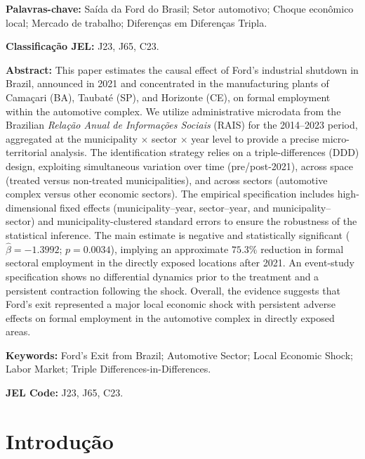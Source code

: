 \documentclass[12pt,a4paper]{article}
\begin{document}
\medskip
\noindent\textbf{Palavras-chave:} Sa\'ida da Ford do Brasil; Setor automotivo; Choque econ\^omico local; Mercado de trabalho; Diferen\c{c}as em Diferen\c{c}as Tripla.

\medskip
\noindent\textbf{Classifica\c{c}\~ao JEL:} J23, J65, C23.

\bigskip

\noindent\textbf{Abstract:} This paper estimates the causal effect of Ford's industrial shutdown in Brazil, announced in 2021 and concentrated in the manufacturing plants of Cama\c{c}ari (BA), Taubat\'e (SP), and Horizonte (CE), on formal employment within the automotive complex. We utilize administrative microdata from the Brazilian \textit{Rela\c{c}\~ao Anual de Informa\c{c}\~oes Sociais} (RAIS) for the 2014--2023 period, aggregated at the municipality $\times$ sector $\times$ year level to provide a precise micro-territorial analysis. The identification strategy relies on a triple-differences (DDD) design, exploiting simultaneous variation over time (pre/post-2021), across space (treated versus non-treated municipalities), and across sectors (automotive complex versus other economic sectors). The empirical specification includes high-dimensional fixed effects (municipality--year, sector--year, and municipality--sector) and municipality-clustered standard errors to ensure the robustness of the statistical inference. The main estimate is negative and statistically significant ($\hat{\beta} = -1.3992$; $p = 0.0034$), implying an approximate $75.3\%$ reduction in formal sectoral employment in the directly exposed locations after 2021. An event-study specification shows no differential dynamics prior to the treatment and a persistent contraction following the shock. Overall, the evidence suggests that Ford's exit represented a major local economic shock with persistent adverse effects on formal employment in the automotive complex in directly exposed areas.

\medskip
\noindent\textbf{Keywords:} Ford's Exit from Brazil; Automotive Sector; Local Economic Shock; Labor Market; Triple Differences-in-Differences.

\medskip
\noindent\textbf{JEL Code:} J23, J65, C23.

\clearpage

\section{Introdu\c{c}\~ao}
\label{sec:intro}
\end{document}
